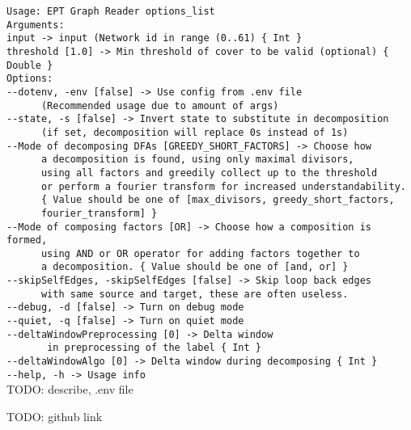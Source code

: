 \verb|Usage: EPT Graph Reader options_list|\\
\verb|Arguments: |\\
\verb|input -> input (Network id in range (0..61) { Int }|\\
\verb|threshold [1.0] -> Min threshold of cover to be valid (optional) { Double }|\\
\verb|Options: |\\
\verb|--dotenv, -env [false] -> Use config from .env file|\\
\verb|		(Recommended usage due to amount of args) |\\
\verb|--state, -s [false] -> Invert state to substitute in decomposition|\\
\verb|		(if set, decomposition will replace 0s instead of 1s) |\\
\verb|--Mode of decomposing DFAs [GREEDY_SHORT_FACTORS] -> Choose how|\\
\verb|		a decomposition is found, using only maximal divisors,|\\
\verb|		using all factors and greedily collect up to the threshold|\\
\verb|		or perform a fourier transform for increased understandability.|\\
\verb|		{ Value should be one of [max_divisors, greedy_short_factors,|\\
\verb| 		fourier_transform] }|\\
\verb|--Mode of composing factors [OR] -> Choose how a composition is formed,|\\
\verb|		using AND or OR operator for adding factors together to|\\
\verb|		a decomposition. { Value should be one of [and, or] }|\\
\verb|--skipSelfEdges, -skipSelfEdges [false] -> Skip loop back edges|\\
\verb|		with same source and target, these are often useless. |\\
\verb|--debug, -d [false] -> Turn on debug mode |\\
\verb|--quiet, -q [false] -> Turn on quiet mode |\\
\verb|--deltaWindowPreprocessing [0] -> Delta window|\\
\verb|		 in preprocessing of the label { Int }|\\
\verb|--deltaWindowAlgo [0] -> Delta window during decomposing { Int }|\\
\verb|--help, -h -> Usage info |\\

TODO: describe, .env file

TODO: github link